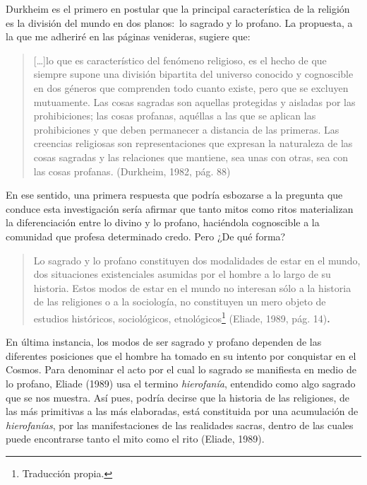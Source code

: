 \begin{refsection}
Durkheim es el primero en postular que la principal característica de la religión es la división del mundo en dos planos:~lo sagrado y lo profano. La propuesta, a la que me adheriré en las páginas venideras, sugiere que:

\begin{quote}
{[}\ldots{}{]}lo que es característico del fenómeno religioso, es el hecho de que siempre supone una división bipartita del universo conocido y cognoscible en dos géneros que comprenden todo cuanto existe, pero que se excluyen mutuamente. Las cosas sagradas son aquellas protegidas y aisladas por las prohibiciones; las cosas profanas, aquéllas a las que se aplican las prohibiciones y que deben permanecer a distancia de las primeras. Las creencias religiosas son representaciones que expresan la naturaleza de las cosas sagradas y las relaciones que mantiene, sea unas con otras, sea con las cosas profanas. (Durkheim, 1982, pág. 88)
\end{quote}

En ese sentido, una primera respuesta que podría esbozarse a la pregunta que conduce esta investigación sería afirmar que tanto mitos como ritos materializan la diferenciación entre lo divino y lo profano, haciéndola cognoscible a la comunidad que profesa determinado credo. Pero ¿De qué forma?

\begin{quote}
Lo sagrado y lo profano constituyen dos modalidades de estar en el mundo, dos situaciones existenciales asumidas por el hombre a lo largo de su historia. Estos modos de estar en el mundo no interesan sólo a la historia de las religiones o a la sociología, no constituyen un mero objeto de estudios históricos, sociológicos, etnológicos\footnote{Traducción propia.} (Eliade, 1989, pág. 14)\textbf{. }
\end{quote}

En última instancia, los modos de ser sagrado y profano dependen de las diferentes posiciones que el hombre ha tomado en su intento por conquistar en el Cosmos. Para denominar el acto por el cual lo sagrado se manifiesta en medio de lo profano, Eliade (1989) usa el termino \emph{hierofanía}, entendido como algo sagrado que se nos muestra. Así pues, podría decirse que la historia de las religiones, de las más primitivas a las más elaboradas, está constituida por una acumulación de \emph{hierofanías}, por las manifestaciones de las realidades sacras, dentro de las cuales puede encontrarse tanto el mito como el rito (Eliade, 1989).


\end{refsection}
